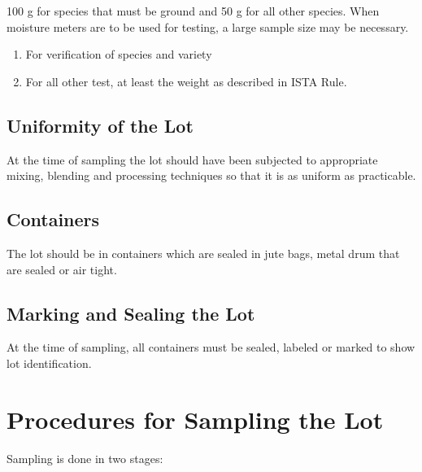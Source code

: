 \documentclass[
]{book}
\begin{document}
100 g for species that must be ground and 50 g for all other species. When moisture meters are to be used for testing, a large sample size may be necessary.

\begin{enumerate}
\def\labelenumi{\alph{enumi})}
\setcounter{enumi}{1}
\item
  For verification of species and variety
\item
  For all other test, at least the weight as described in ISTA Rule.
\end{enumerate}

\hypertarget{uniformity-of-the-lot}{%
\subsection{Uniformity of the Lot}\label{uniformity-of-the-lot}}

At the time of sampling the lot should have been subjected to appropriate mixing, blending and processing techniques so that it is as uniform as practicable.

\hypertarget{containers}{%
\subsection{Containers}\label{containers}}

The lot should be in containers which are sealed in jute bags, metal drum that are sealed or air tight.

\hypertarget{marking-and-sealing-the-lot}{%
\subsection{Marking and Sealing the Lot}\label{marking-and-sealing-the-lot}}

At the time of sampling, all containers must be sealed, labeled or marked to show lot identification.

\hypertarget{procedures-for-sampling-the-lot}{%
\section{Procedures for Sampling the Lot}\label{procedures-for-sampling-the-lot}}

Sampling is done in two stages:
\end{document}
